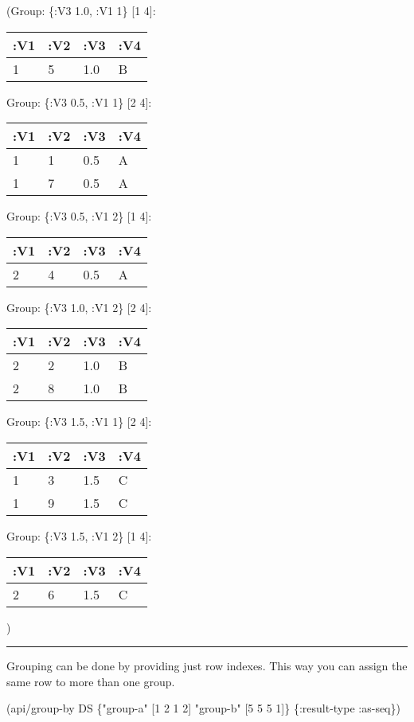 \documentclass[]{article}
\newenvironment{Shaded}{\begin{snugshade}}{\end{snugshade}}
\newcommand{\AttributeTok}[1]{\textcolor[rgb]{0.77,0.63,0.00}{#1}}
\newcommand{\DecValTok}[1]{\textcolor[rgb]{0.00,0.00,0.81}{#1}}
\newcommand{\NormalTok}[1]{#1}
\newcommand{\StringTok}[1]{\textcolor[rgb]{0.31,0.60,0.02}{#1}}
\begin{document}
(Group: \{:V3 1.0, :V1 1\} {[}1 4{]}:

\begin{longtable}[]{@{}llll@{}}
\toprule
:V1 & :V2 & :V3 & :V4\tabularnewline
\midrule
\endhead
1 & 5 & 1.0 & B\tabularnewline
\bottomrule
\end{longtable}

Group: \{:V3 0.5, :V1 1\} {[}2 4{]}:

\begin{longtable}[]{@{}llll@{}}
\toprule
:V1 & :V2 & :V3 & :V4\tabularnewline
\midrule
\endhead
1 & 1 & 0.5 & A\tabularnewline
1 & 7 & 0.5 & A\tabularnewline
\bottomrule
\end{longtable}

Group: \{:V3 0.5, :V1 2\} {[}1 4{]}:

\begin{longtable}[]{@{}llll@{}}
\toprule
:V1 & :V2 & :V3 & :V4\tabularnewline
\midrule
\endhead
2 & 4 & 0.5 & A\tabularnewline
\bottomrule
\end{longtable}

Group: \{:V3 1.0, :V1 2\} {[}2 4{]}:

\begin{longtable}[]{@{}llll@{}}
\toprule
:V1 & :V2 & :V3 & :V4\tabularnewline
\midrule
\endhead
2 & 2 & 1.0 & B\tabularnewline
2 & 8 & 1.0 & B\tabularnewline
\bottomrule
\end{longtable}

Group: \{:V3 1.5, :V1 1\} {[}2 4{]}:

\begin{longtable}[]{@{}llll@{}}
\toprule
:V1 & :V2 & :V3 & :V4\tabularnewline
\midrule
\endhead
1 & 3 & 1.5 & C\tabularnewline
1 & 9 & 1.5 & C\tabularnewline
\bottomrule
\end{longtable}

Group: \{:V3 1.5, :V1 2\} {[}1 4{]}:

\begin{longtable}[]{@{}llll@{}}
\toprule
:V1 & :V2 & :V3 & :V4\tabularnewline
\midrule
\endhead
2 & 6 & 1.5 & C\tabularnewline
\bottomrule
\end{longtable}

)

\begin{center}\rule{0.5\linewidth}{0.5pt}\end{center}

Grouping can be done by providing just row indexes. This way you can
assign the same row to more than one group.

\begin{Shaded}
\begin{Highlighting}[]
\NormalTok{(api/group-by DS \{}\StringTok{"group-a"}\NormalTok{ [}\DecValTok{1} \DecValTok{2} \DecValTok{1} \DecValTok{2}\NormalTok{]}
                  \StringTok{"group-b"}\NormalTok{ [}\DecValTok{5} \DecValTok{5} \DecValTok{5} \DecValTok{1}\NormalTok{]\} \{}\AttributeTok{:result-type} \AttributeTok{:as-seq}\NormalTok{\})}
\end{Highlighting}
\end{Shaded}
\end{document}
